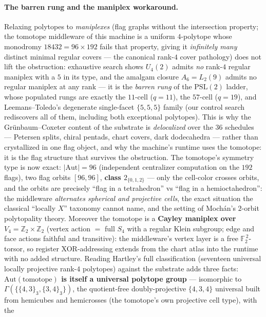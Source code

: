 \documentclass[11pt]{article}
\newcommand{\GF}[1]{\mathbb{F}_{#1}}
\begin{document}
\paragraph{The barren rung and the maniplex workaround.}
Relaxing polytopes to \emph{maniplexes} (flag graphs without the
intersection property; the tomotope middleware of this machine is a
uniform $4$-polytope whose monodromy $18432=96\times192$ fails that
property, giving it \emph{infinitely many} distinct minimal regular
covers --- the canonical rank-$4$ cover pathology) does not lift
the obstruction: exhaustive search shows $U_4(2)$ admits \emph{no}
rank-$4$ regular maniplex with a $5$ in its type, and the amalgam
closure $A_6=L_2(9)$ admits no regular maniplex at any rank ---
it is the \emph{barren rung} of the $\mathrm{PSL}(2)$ ladder, whose
populated rungs are exactly the $11$-cell ($q{=}11$), the $57$-cell
($q{=}19$), and Leemans--Toledo's degenerate single-facet
$\{5,5,5\}$ family (our control search rediscovers all of them,
including both exceptional polytopes).  This is why the
Gr\"unbaum--Coxeter content of the substrate is \emph{delocalized}
over the $36$ schedules --- Petersen splits, chiral pentads, chart
covers, dark dodecahedra --- rather than crystallized in one flag
object, and why the machine's runtime uses the tomotope: it is the
flag structure that survives the obstruction.
The tomotope's symmetry type is now exact: $|\mathrm{Aut}|=96$
(independent centralizer computation on the $192$ flags), two flag
orbits $[96,96]$, \textbf{class $2_{\{0,1,2\}}$} --- only the
cell-color crosses orbits, and the orbits are precisely
``flag in a tetrahedron'' vs ``flag in a hemioctahedron'': the
middleware \emph{alternates spherical and projective cells}, the
exact situation the classical ``locally $X$'' taxonomy cannot name,
and the setting of Moch\'an's $2$-orbit polytopality theory.
Moreover the tomotope is a \textbf{Cayley maniplex over
$V_4=\mathbb{Z}_2\times\mathbb{Z}_2$} (vertex action $=$ full $S_4$
with a regular Klein subgroup; edge and face actions faithful and
transitive): the middleware's vertex layer is a free
$\GF2^{\,2}$-torsor, so register XOR-addressing extends from the
chart atlas into the runtime with no added structure.
Reading Hartley's full classification (seventeen universal locally
projective rank-$4$ polytopes) against the substrate adds three
facts: \textbf{$\mathrm{Aut}(\text{tomotope})$ is itself a universal
polytope group} --- isomorphic to
$\Gamma(\{\{4,3\}_3,\{3,4\}_3\})$, the quotient-free
doubly-projective $\{4,3,4\}$ universal built from hemicubes and
hemicrosses (the tomotope's own projective cell type), with the
\end{document}
